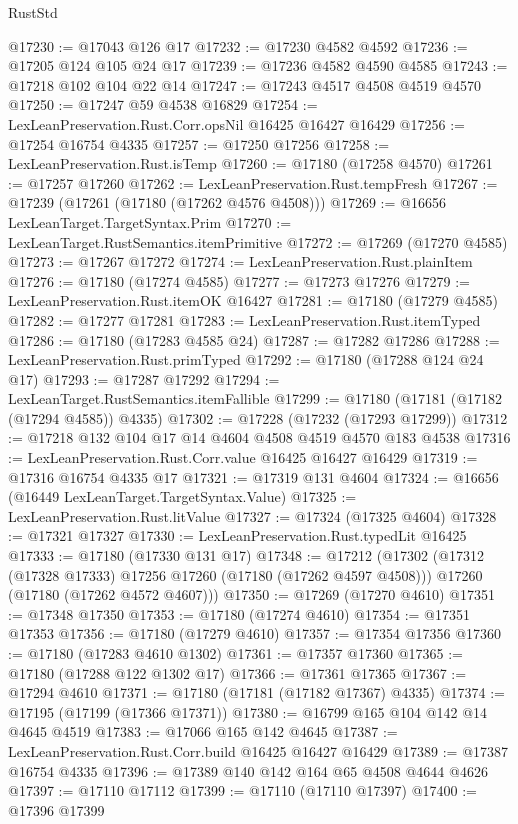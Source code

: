 \begin{lexlean}{RustStd}
\begin{coremodule}
{\begin{coremodule}
{{{{{{{{{{{{{{{{{{{{{{{{{{{{{{{{{{{{{{{{{{{{{{{{{{{{{{{@17230 := @17043 @126 @17
@17232 := @17230 @4582 @4592
@17236 := @17205 @124 @105 @24 @17
@17239 := @17236 @4582 @4590 @4585
@17243 := @17218 @102 @104 @22 @14
@17247 := @17243 @4517 @4508 @4519 @4570
@17250 := @17247 @59 @4538 @16829
@17254 := LexLeanPreservation.Rust.Corr.opsNil @16425 @16427 @16429
@17256 := @17254 @16754 @4335
@17257 := @17250 @17256
@17258 := LexLeanPreservation.Rust.isTemp
@17260 := @17180 (@17258 @4570)
@17261 := @17257 @17260
@17262 := LexLeanPreservation.Rust.tempFresh
@17267 := @17239 (@17261 (@17180 (@17262 @4576 @4508)))
@17269 := @16656 LexLeanTarget.TargetSyntax.Prim
@17270 := LexLeanTarget.RustSemantics.itemPrimitive
@17272 := @17269 (@17270 @4585)
@17273 := @17267 @17272
@17274 := LexLeanPreservation.Rust.plainItem
@17276 := @17180 (@17274 @4585)
@17277 := @17273 @17276
@17279 := LexLeanPreservation.Rust.itemOK @16427
@17281 := @17180 (@17279 @4585)
@17282 := @17277 @17281
@17283 := LexLeanPreservation.Rust.itemTyped
@17286 := @17180 (@17283 @4585 @24)
@17287 := @17282 @17286
@17288 := LexLeanPreservation.Rust.primTyped
@17292 := @17180 (@17288 @124 @24 @17)
@17293 := @17287 @17292
@17294 := LexLeanTarget.RustSemantics.itemFallible
@17299 := @17180 (@17181 (@17182 (@17294 @4585)) @4335)
@17302 := @17228 (@17232 (@17293 @17299))
@17312 := @17218 @132 @104 @17 @14 @4604 @4508 @4519 @4570 @183 @4538
@17316 := LexLeanPreservation.Rust.Corr.value @16425 @16427 @16429
@17319 := @17316 @16754 @4335 @17
@17321 := @17319 @131 @4604
@17324 := @16656 (@16449 LexLeanTarget.TargetSyntax.Value)
@17325 := LexLeanPreservation.Rust.litValue
@17327 := @17324 (@17325 @4604)
@17328 := @17321 @17327
@17330 := LexLeanPreservation.Rust.typedLit @16425
@17333 := @17180 (@17330 @131 @17)
@17348 := @17212
    (@17302
      (@17312 (@17328 @17333) @17256 @17260 (@17180 (@17262 @4597 @4508)))
      @17260
      (@17180 (@17262 @4572 @4607)))
@17350 := @17269 (@17270 @4610)
@17351 := @17348 @17350
@17353 := @17180 (@17274 @4610)
@17354 := @17351 @17353
@17356 := @17180 (@17279 @4610)
@17357 := @17354 @17356
@17360 := @17180 (@17283 @4610 @1302)
@17361 := @17357 @17360
@17365 := @17180 (@17288 @122 @1302 @17)
@17366 := @17361 @17365
@17367 := @17294 @4610
@17371 := @17180 (@17181 (@17182 @17367) @4335)
@17374 := @17195 (@17199 (@17366 @17371))
@17380 := @16799 @165 @104 @142 @14 @4645 @4519
@17383 := @17066 @165 @142 @4645
@17387 := LexLeanPreservation.Rust.Corr.build @16425 @16427 @16429
@17389 := @17387 @16754 @4335
@17396 := @17389 @140 @142 @164 @65 @4508 @4644 @4626
@17397 := @17110 @17112
@17399 := @17110 (@17110 @17397)
@17400 := @17396 @17399
}}}}}}}}}}}}}}}}}}}}}}}}}}}}}}}}}}}}}}}}}}}}}}}}}}}}}}}
\end{coremodule}}
\end{coremodule}
\end{lexlean}

